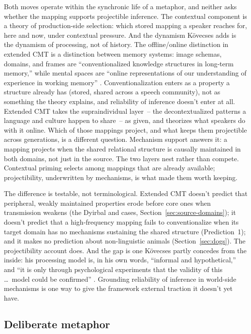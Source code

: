 \documentclass[12pt]{article}
\begin{document}
Both moves operate within the synchronic life of a metaphor, and neither asks whether the mapping supports projectible inference. The contextual component is a theory of production-side selection: which stored mapping a speaker reaches for, here and now, under contextual pressure. And the dynamism Kövecses adds is the dynamism of processing, not of history. The offline/online distinction in extended CMT is a distinction between memory systems: image schemas, domains, and frames are \enquote{conventionalized knowledge structures in long-term memory,} while mental spaces are \enquote{online representations of our understanding of experience in working memory} \citep[326]{kovecses2017}. Conventionalization enters as a property a structure already has (stored, shared across a speech community), not as something the theory explains, and reliability of inference doesn't enter at all. Extended CMT takes the supraindividual layer~-- the decontextualized patterns a language and culture happen to share~-- as given, and theorizes what speakers do with it online. Which of those mappings project, and what keeps them projectible across generations, is a different question. Mechanism support answers it: a mapping projects when the shared relational structure is causally maintained in both domains, not just in the source. The two layers nest rather than compete. Contextual priming selects among mappings that are already available; projectibility, underwritten by mechanisms, is what made them worth keeping.

The difference is testable, not terminological. Extended CMT doesn't predict that peripheral, weakly maintained properties erode before core ones when transmission weakens (the Dyirbal and  cases, Section~\ref{sec:source-domains}); it doesn't predict that a high-frequency mapping fails to conventionalize when its target domain has no mechanisms sustaining the shared structure (Prediction~1); and it makes no prediction about non-linguistic animals (Section~\ref{sec:dogs}). The projectibility account does. And the gap is one Kövecses partly concedes from the inside: his processing model is, in his own words, \enquote{informal and hypothetical,} and \enquote{it is only through psychological experiments that the validity of this \ldots\ model could be confirmed} \citep[125]{kovecses2020article}. Grounding reliability of inference in world-side mechanisms is one way to give the framework external traction it doesn't yet have.

\subsection{Deliberate metaphor}
\end{document}
